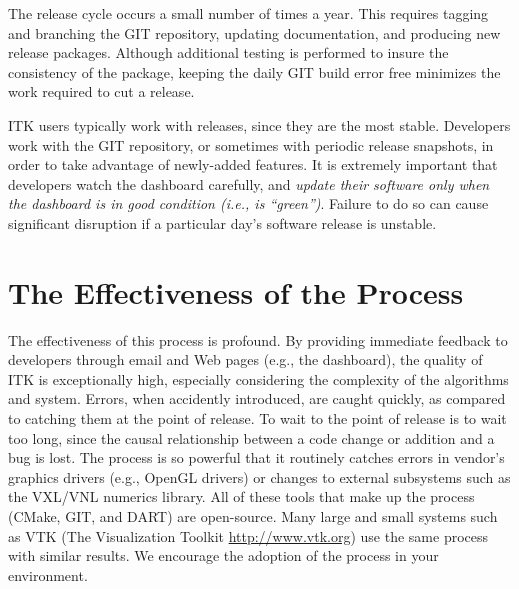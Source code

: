 The release cycle occurs a small number of times a year. This requires
tagging and branching the GIT repository, updating documentation, and
producing new release packages. Although additional testing is performed to
insure the consistency of the package, keeping the daily GIT build error free
minimizes the work required to cut a release.

ITK users typically work with releases, since they are the most
stable. Developers work with the GIT repository, or sometimes with periodic
release snapshots, in order to take advantage of newly-added features. It is
extremely important that developers watch the dashboard carefully, and
\emph{update their software only when the dashboard is in good condition
(i.e., is ``green'')}. Failure to do so can cause significant disruption if a
particular day's software release is unstable.

\section{The Effectiveness of the Process}
\label{sec:Effectiveness}

The effectiveness of this process is profound. By providing immediate
feedback to developers through email and Web pages (e.g., the dashboard), the
quality of ITK is exceptionally high, especially considering the complexity
of the algorithms and system. Errors, when accidently introduced, are caught
quickly, as compared to catching them at the point of release. To wait to the
point of release is to wait too long, since the causal relationship between a
code change or addition and a bug is lost. The process is so powerful that it
routinely catches errors in vendor's graphics drivers (e.g., OpenGL drivers)
or changes to external subsystems such as the VXL/VNL numerics library. All
of these tools that make up the process (CMake, GIT, and DART) are
open-source. Many large and small systems such as VTK (The Visualization
Toolkit \url{http://www.vtk.org}) use the same process with similar
results. We encourage the adoption of the process in your environment.


